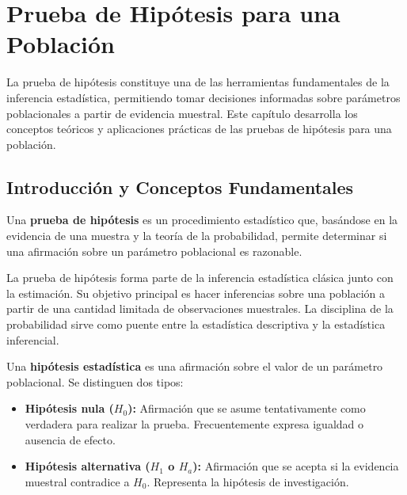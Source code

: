 \chapter{Prueba de Hipótesis para una Población}



La prueba de hipótesis constituye una de las herramientas fundamentales de la inferencia estadística, permitiendo tomar decisiones informadas sobre parámetros poblacionales a partir de evidencia muestral. Este capítulo desarrolla los conceptos teóricos y aplicaciones prácticas de las pruebas de hipótesis para una población.

\section{Introducción y Conceptos Fundamentales}

\begin{definition}
Una \textbf{prueba de hipótesis} es un procedimiento estadístico que, basándose en la evidencia de una muestra y la teoría de la probabilidad, permite determinar si una afirmación sobre un parámetro poblacional es razonable.
\end{definition}

\begin{remark}
La prueba de hipótesis forma parte de la inferencia estadística clásica junto con la estimación. Su objetivo principal es hacer inferencias sobre una población a partir de una cantidad limitada de observaciones muestrales. La disciplina de la probabilidad sirve como puente entre la estadística descriptiva y la estadística inferencial.
\end{remark}

\begin{definition}
Una \textbf{hipótesis estadística} es una afirmación sobre el valor de un parámetro poblacional. Se distinguen dos tipos:
\begin{itemize}
    \item \textbf{Hipótesis nula ($H_0$):} Afirmación que se asume tentativamente como verdadera para realizar la prueba. Frecuentemente expresa igualdad o ausencia de efecto.
    \item \textbf{Hipótesis alternativa ($H_1$ o $H_a$):} Afirmación que se acepta si la evidencia muestral contradice a $H_0$. Representa la hipótesis de investigación.
\end{itemize}
\end{definition}

